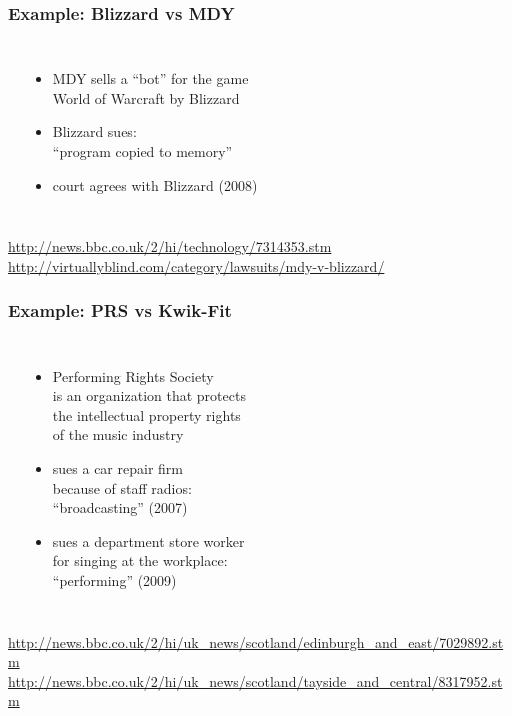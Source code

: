 \documentclass[dvipsnames]{beamer}
\theoremstyle{plain}
\begin{document}
\begin{frame}
  \frametitle{Example: Blizzard vs MDY}

  \begin{columns}
    \begin{center}
    \end{center}

    \begin{itemize}
      \item MDY sells a ``bot'' for the game\\
        World of Warcraft by Blizzard
      \item Blizzard sues:\\
        ``program copied to memory''
      \item court agrees with Blizzard (2008)
    \end{itemize}
  \end{columns}

  \medskip
  \tiny{\url{http://news.bbc.co.uk/2/hi/technology/7314353.stm}}\\
  \tiny{\url{http://virtuallyblind.com/category/lawsuits/mdy-v-blizzard/}}\\
\end{frame}

\begin{frame}
  \frametitle{Example: PRS vs Kwik-Fit}

  \begin{columns}
    \begin{center}
    \end{center}

    \begin{itemize}
      \item Performing Rights Society\\
        is an organization that protects\\
        the intellectual property rights\\
        of the music industry
      \item sues a car repair firm\\
        because of staff radios:\\
        ``broadcasting'' (2007)
      \item sues a department store worker\\
        for singing at the workplace:\\
        ``performing'' (2009)
    \end{itemize}
  \end{columns}

  \medskip
  \tiny{\url{http://news.bbc.co.uk/2/hi/uk_news/scotland/edinburgh_and_east/7029892.stm}}\\
  \tiny{\url{http://news.bbc.co.uk/2/hi/uk_news/scotland/tayside_and_central/8317952.stm}}\\
\end{frame}
\end{document}
